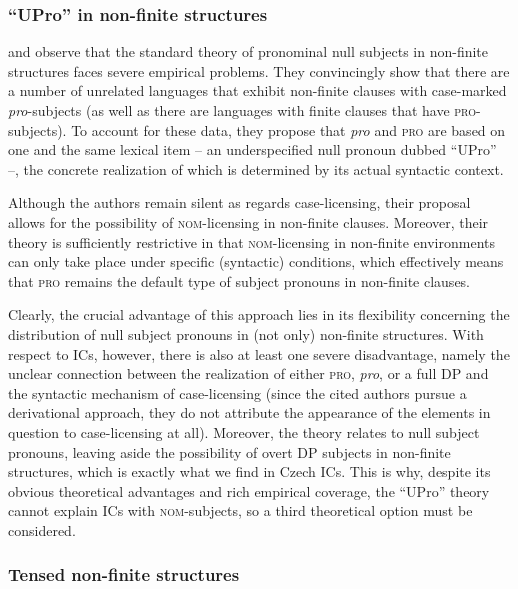 \documentclass[output=paper,colorlinks,citecolor=brown,
modfonts,newtxmath
]{langscibook}
\begin{document}
\subsubsection{``UPro'' in non-finite structures}\label{sec:nom_possibilities_2}

\citet{Sundaresan2014} and \citet{McFaddenSundaresan2018} observe that the standard theory of pronominal null subjects in non-finite structures faces severe empirical problems. They convincingly show that there are a number of unrelated languages that exhibit non-finite clauses with case-marked \textit{pro}-subjects (as well as there are languages with finite clauses that have \textsc{pro}-subjects). To account for these data, they propose that \textit{pro} and \textsc{pro} are based on one and the same lexical item -- an underspecified null pronoun dubbed ``UPro'' --, the concrete realization of which is determined by its actual syntactic context.

Although the authors remain silent as regards case-licensing, their proposal allows for the possibility of \textsc{nom}-licensing in non-finite clauses. Moreover, their theory is sufficiently restrictive in that \textsc{nom}-licensing in non-finite environments can only take place under specific (syntactic) conditions, which effectively means that \textsc{pro} remains the default type of subject pronouns in non-finite clauses.

Clearly, the crucial advantage of this approach lies in its flexibility concerning the distribution of null subject pronouns in (not only) non-finite structures. With respect to ICs, however, there is also at least one severe disadvantage, namely the unclear connection between the realization of either \textsc{pro}, \textit{pro}, or a full DP and the syntactic mechanism of case-licensing (since the cited authors pursue a derivational approach, they do not attribute the appearance of the elements in question to case-licensing at all). Moreover, the theory relates to null subject pronouns, leaving aside the possibility of overt DP subjects in non-finite structures, which is exactly what we find in Czech ICs. This is why, despite its obvious theoretical advantages and rich empirical coverage, the ``UPro'' theory cannot explain ICs with \textsc{nom}-subjects, so a third theoretical option must be considered.
	
\subsubsection{Tensed non-finite structures}\label{sec:nom_possibilities_3}
\end{document}
